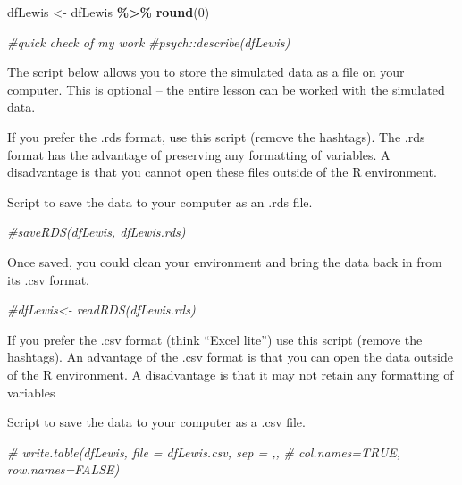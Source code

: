 \documentclass[
  11pt,
]{book}
\newenvironment{Shaded}{\begin{snugshade}}{\end{snugshade}}
\newcommand{\CommentTok}[1]{\textcolor[rgb]{0.37,0.37,0.37}{\textit{#1}}}
\newcommand{\DecValTok}[1]{\textcolor[rgb]{0.06,0.06,0.06}{#1}}
\newcommand{\FunctionTok}[1]{\textcolor[rgb]{0.27,0.27,0.27}{\textbf{#1}}}
\newcommand{\NormalTok}[1]{#1}
\newcommand{\OtherTok}[1]{\textcolor[rgb]{0.37,0.37,0.37}{#1}}
\newcommand{\SpecialCharTok}[1]{\textcolor[rgb]{0.43,0.43,0.43}{\textbf{#1}}}
\begin{document}
\begin{Shaded}
\begin{Highlighting}[]
\NormalTok{dfLewis }\OtherTok{\textless{}{-}}\NormalTok{ dfLewis }\SpecialCharTok{\%\textgreater{}\%} \FunctionTok{round}\NormalTok{(}\DecValTok{0}\NormalTok{) }

\CommentTok{\#quick check of my work}
\CommentTok{\#psych::describe(dfLewis) }
\end{Highlighting}
\end{Shaded}

The script below allows you to store the simulated data as a file on your computer. This is optional -- the entire lesson can be worked with the simulated data.

If you prefer the .rds format, use this script (remove the hashtags). The .rds format has the advantage of preserving any formatting of variables. A disadvantage is that you cannot open these files outside of the R environment.

Script to save the data to your computer as an .rds file.

\begin{Shaded}
\begin{Highlighting}[]
\CommentTok{\#saveRDS(dfLewis, \textquotesingle{}dfLewis.rds\textquotesingle{})  }
\end{Highlighting}
\end{Shaded}

Once saved, you could clean your environment and bring the data back in from its .csv format.

\begin{Shaded}
\begin{Highlighting}[]
\CommentTok{\#dfLewis\textless{}{-} readRDS(\textquotesingle{}dfLewis.rds\textquotesingle{})}
\end{Highlighting}
\end{Shaded}

If you prefer the .csv format (think ``Excel lite'') use this script (remove the hashtags). An advantage of the .csv format is that you can open the data outside of the R environment. A disadvantage is that it may not retain any formatting of variables

Script to save the data to your computer as a .csv file.

\begin{Shaded}
\begin{Highlighting}[]
\CommentTok{\# write.table(dfLewis, file = \textquotesingle{}dfLewis.csv\textquotesingle{}, sep = \textquotesingle{},\textquotesingle{},}
\CommentTok{\# col.names=TRUE, row.names=FALSE)}
\end{Highlighting}
\end{Shaded}
\end{document}
